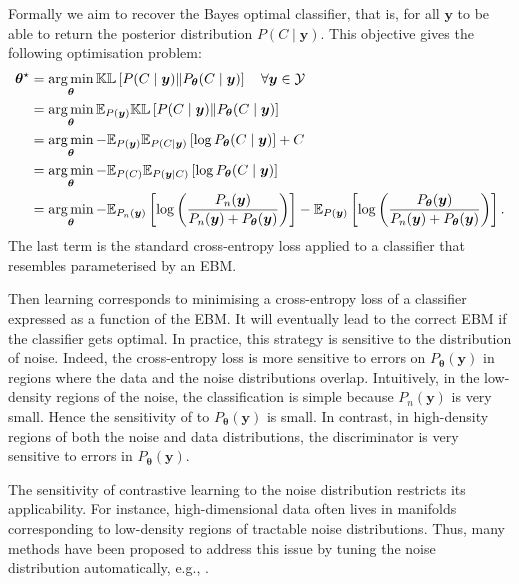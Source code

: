 Formally we aim to recover the Bayes optimal classifier, that is, for all $\mathbf{y}$ to be able to return the posterior distribution $P(C \mid \mathbf{y})$. This objective gives the following optimisation problem:
\begin{align}
  \bm{\theta}^\star &= \argmin_{\bm{\theta}} \mathbb{KL}\left[ P(C \mid \mathbf{y}) \Vert P_{\bm{\theta}}(C \mid \mathbf{y}) \right] \quad \forall \mathbf{y} \in \mathcal{Y}\\
  &=\argmin_{\bm{\theta}} \mathbb{E}_{P(\mathbf{y})}\mathbb{KL}\left[ P(C \mid \mathbf{y}) \Vert P_{\bm{\theta}}(C \mid \mathbf{y}) \right]\\
  &= \argmin_{\bm{\theta}} -\mathbb{E}_{P(\mathbf{y})}\mathbb{E}_{P(C \mid \mathbf{y})}\left[ \log P_{\bm{\theta}}(C \mid \mathbf{y}) \right] + C\\
  &= \argmin_{\bm{\theta}} -\mathbb{E}_{P(C)}\mathbb{E}_{P(\mathbf{y} \mid C)}\left[ \log P_{\bm{\theta}}(C \mid \mathbf{y}) \right]\\
  &= \argmin_{\bm{\theta}} -\mathbb{E}_{P_n(\mathbf{y})}\left[ \log \left( \frac{P_n(\mathbf{y})}{P_n(\mathbf{y}) + P_{\bm{\theta}}(\mathbf{y})} \right)  \right] -\mathbb{E}_{P(\mathbf{y})}\left[ \log \left( \frac{P_{\bm{\theta}}(\mathbf{y})}{P_n(\mathbf{y}) + P_{\bm{\theta}}(\mathbf{y})} \right) \right].
\end{align}
The last term is the standard cross-entropy loss applied to a classifier that resembles  parameterised by an EBM.

Then learning corresponds to minimising a cross-entropy loss of a classifier expressed as a function of the EBM. It will eventually lead to the correct EBM if the classifier gets optimal. In practice, this strategy is sensitive to the distribution of noise. Indeed, the cross-entropy loss is more sensitive to errors on $P_{\bm{\theta}}(\bm{y})$ in regions where the data and the noise distributions overlap. Intuitively, in the low-density regions of the noise, the classification is simple because $P_n(\mathbf{y})$ is very small. Hence the sensitivity of  to $P_{\bm{\theta}}(\bm{y})$ is small. In contrast, in high-density regions of both the noise and data distributions, the discriminator is very sensitive to errors in $P_{\bm{\theta}}(\bm{y})$.

The sensitivity of contrastive learning to the noise distribution restricts its applicability. For instance, high-dimensional data often lives in manifolds corresponding to low-density regions of tractable noise distributions. Thus, many methods have been proposed to address this issue by tuning the noise distribution automatically, e.g., \citep{bose2018adversarial, ceylan2018conditional, gao2020flow}.

